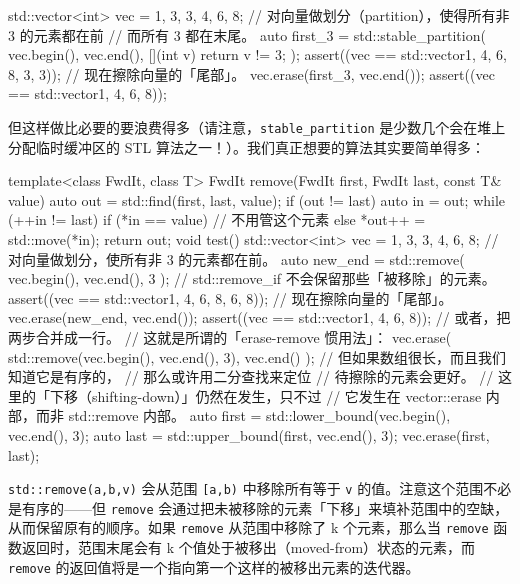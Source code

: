 \begin{codebox}[cpp]
    std::vector<int> vec = {1, 3, 3, 4, 6, 8};
    // 对向量做划分（partition），使得所有非 3 的元素都在前
    // 而所有 3 都在末尾。
    auto first_3 = std::stable_partition(
      vec.begin(), vec.end(), [](int v){ return v != 3; }
    );
    assert((vec == std::vector{1, 4, 6, 8, 3, 3}));
    // 现在擦除向量的「尾部」。
    vec.erase(first_3, vec.end());
    assert((vec == std::vector{1, 4, 6, 8}));
\end{codebox}

但这样做比必要的要浪费得多（请注意，\texttt{stable\_\allowbreak{}partition} 是少数几个会在堆上分配临时缓冲区的 STL 算法之一！）。我们真正想要的算法其实要简单得多：

\begin{codebox}[cpp]
    template<class FwdIt, class T>
    FwdIt remove(FwdIt first, FwdIt last, const T& value)
    {
      auto out = std::find(first, last, value);
      if (out != last) {
        auto in = out;
        while (++in != last) {
          if (*in == value) {
             // 不用管这个元素
          } else {
             *out++ = std::move(*in);
          }
        }
      }
      return out;
    }
    void test()
    {
      std::vector<int> vec = {1, 3, 3, 4, 6, 8};
      // 对向量做划分，使所有非 3 的元素都在前。
      auto new_end = std::remove(
        vec.begin(), vec.end(), 3
      );
      // std::remove_if 不会保留那些「被移除」的元素。
      assert((vec == std::vector{1, 4, 6, 8, 6, 8}));
      // 现在擦除向量的「尾部」。
      vec.erase(new_end, vec.end());
      assert((vec == std::vector{1, 4, 6, 8}));
      // 或者，把两步合并成一行。
      // 这就是所谓的「erase-remove 惯用法」：
      vec.erase(
        std::remove(vec.begin(), vec.end(), 3),
        vec.end()
      );
      // 但如果数组很长，而且我们知道它是有序的，
      // 那么或许用二分查找来定位
      // 待擦除的元素会更好。
      // 这里的「下移（shifting-down）」仍然在发生，只不过
      // 它发生在 vector::erase 内部，而非 std::remove 内部。
      auto first = std::lower_bound(vec.begin(), vec.end(), 3);
      auto last = std::upper_bound(first, vec.end(), 3);
      vec.erase(first, last);
    }
\end{codebox}

\texttt{std::\allowbreak{}remove(\allowbreak{}a,\allowbreak{}b,\allowbreak{}v)\allowbreak{}} 会从范围 \texttt{[a,\allowbreak{}b)\allowbreak{}} 中移除所有等于 \texttt{v} 的值。注意这个范围不必是有序的——但 \texttt{remove} 会通过把未被移除的元素「下移」来填补范围中的空缺，从而保留原有的顺序。如果 \texttt{remove} 从范围中移除了 k 个元素，那么当 \texttt{remove} 函数返回时，范围末尾会有 k 个值处于被移出（moved-from）状态的元素，而 \texttt{remove} 的返回值将是一个指向第一个这样的被移出元素的迭代器。

